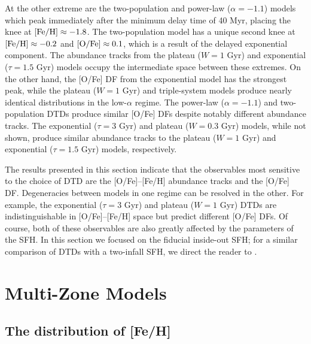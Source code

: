 \documentclass[twocolumn,twocolappendix,linenumbers,trackchanges]{aastex631}
\begin{document}
At the other extreme are the two-population and power-law ($\alpha=-1.1$) models which peak immediately after the minimum delay time of 40 Myr, placing the knee at ${\rm [Fe/H]}\approx-1.8$. The two-population model has a unique second knee at ${\rm [Fe/H]}\approx-0.2$ and ${\rm [O/Fe]}\approx0.1$, which is a result of the delayed exponential component. The abundance tracks from the plateau ($W=1$ Gyr) and exponential ($\tau=1.5$ Gyr) models occupy the intermediate space between these extremes. On the other hand, the [O/Fe] DF from the exponential model has the strongest peak, while the plateau ($W=1$ Gyr) and triple-system models produce nearly identical distributions in the low-$\alpha$ regime. The power-law ($\alpha=-1.1$) and two-population DTDs produce similar [O/Fe] DFs despite notably different abundance tracks. The exponential ($\tau=3$ Gyr) and plateau ($W=0.3$ Gyr) models, while not shown, produce similar abundance tracks to the plateau ($W=1$ Gyr) and exponential ($\tau=1.5$ Gyr) models, respectively.

The results presented in this section indicate that the observables most sensitive to the choice of DTD are the [O/Fe]--[Fe/H] abundance tracks and the [O/Fe] DF. Degeneracies between models in one regime can be resolved in the other. For example, the exponential ($\tau=3$ Gyr) and plateau ($W=1$ Gyr) DTDs are indistinguishable in [O/Fe]--[Fe/H] space but predict different [O/Fe] DFs. Of course, both of these observables are also greatly affected by the parameters of the SFH. In this section we focused on the fiducial inside-out SFH; for a similar comparison of DTDs with a two-infall SFH, we direct the reader to \citet{Palicio2023-AnalyticDTD}.

\section{Multi-Zone Models}
\label{sec:multizone-results}

\subsection{The distribution of [Fe/H]}
\label{sec:feh-df}
\end{document}
